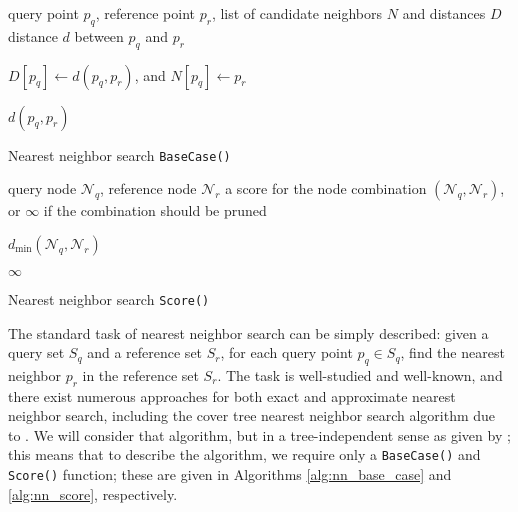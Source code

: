 \begin{algorithm}[tb]
\begin{algorithmic}
     query point $p_q$, reference point $p_r$, list of
candidate neighbors $N$ and distances $D$
     distance $d$ between $p_q$ and $p_r$

    \medskip

    \STATE  $D[p_q] \gets d(p_q, p_r)$, and $N[p_q] \gets p_r$
    \ENDIF

    \RETURN $d(p_q, p_r)$
  \end{algorithmic}

  \caption{Nearest neighbor search \texttt{BaseCase()}}
  \label{alg:nn_base_case}
\end{algorithm}

\begin{algorithm}[tb]
  \begin{algorithmic}
     query node $\mathscr{N}_q$, reference node
$\mathscr{N}_r$
     a score for the node combination $(\mathscr{N}_q,
\mathscr{N}_r)$, or $\infty$ if the combination should be pruned

    \medskip

      \RETURN $d_{\min}(\mathscr{N}_q, \mathscr{N}_r)$
    \ENDIF

    \RETURN $\infty$
  \end{algorithmic}

  \caption{Nearest neighbor search \texttt{Score()}}
  \label{alg:nn_score}
\end{algorithm}

The standard task of nearest neighbor search can be simply described: given a
query set $S_q$ and a reference set $S_r$, for each query point $p_q \in S_q$,
find the nearest neighbor $p_r$ in the reference set $S_r$.  The task is
well-studied and well-known, and there exist numerous approaches for both exact
and approximate nearest neighbor search, including the cover tree nearest
neighbor search algorithm due to \citet{langford2006}.  We will consider that
algorithm, but in a tree-independent sense as given by \citet{curtin2013tree};
this means that to describe the algorithm, we require only a \texttt{BaseCase()}
and \texttt{Score()} function; these are given in Algorithms
\ref{alg:nn_base_case} and \ref{alg:nn_score}, respectively.

